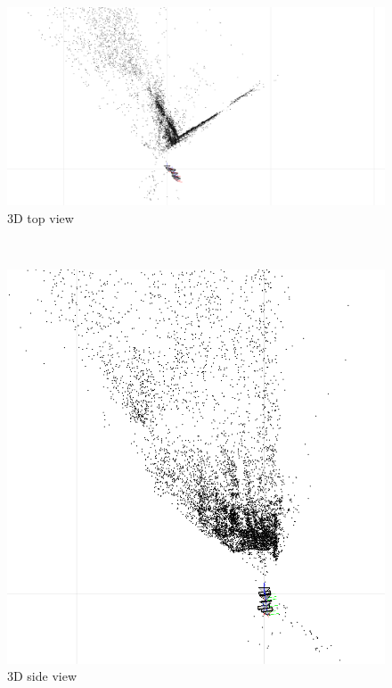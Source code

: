 \documentclass[10pt,letterpaper]{article}
\begin{document}
\begin{enumerate}[]
\begin{figure}[h!]
 \center
  \includegraphics[width=5in]{../images/final-3d-top}
  \caption
   {3D top view}
\end{figure} \\
\begin{figure}[h!]
 \center
  \includegraphics[width=5in]{../images/final-3d-side}
  \caption
   {3D side view}
\end{figure} \\
\begin{figure}[h!]
 \center

\end{figure}
\end{enumerate}
\end{document}

